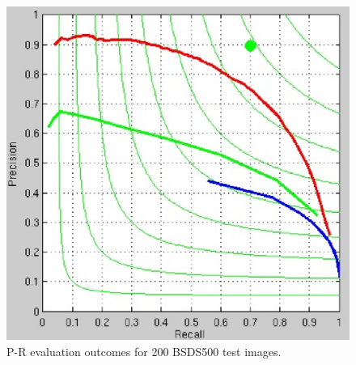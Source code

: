 \documentclass[10pt,twocolumn,letterpaper]{article}
\begin{document}
\begin{figure}[t]
\begin{center}
   \includegraphics[width=0.8\linewidth]{P_RF.eps}
\end{center}
   \caption{P-R evaluation outcomes for 200 BSDS500 test images.}
\label{fig:P_RF}
\end{figure}
\end{document}
